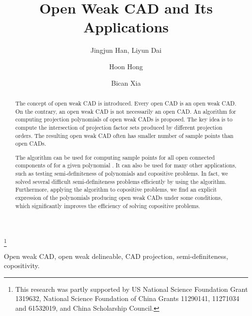 \documentclass[amsthm]{elsart}
\begin{document}
\begin{frontmatter}

\title{\textbf{Open Weak CAD and Its Applications}}

\thanks{This research was partly supported by US National Science Foundation Grant 1319632, National Science Foundation of China Grants 11290141, 11271034 and 61532019, and China Scholarship Council.}

\author{Jingjun Han, Liyun Dai}
\address{LMAM  School of Mathematical Sciences\\  Beijing International Center for Mathematical Research\\Peking University, Beijing 100871, China}

\author{Hoon Hong}
\address{Department of Mathematics, North Carolina State University, Raleigh NC 27695, USA}

\author{Bican Xia}
\address{LMAM  School of Mathematical Sciences, Peking University, Beijing 100871, China}


\begin{abstract}
The concept of open weak CAD is introduced. Every open CAD is an open weak CAD. On the contrary, an open weak CAD is not necessarily an open CAD. An algorithm for computing projection polynomials of open weak CADs is proposed. The key idea is to compute the intersection of projection factor sets produced by different projection orders. The resulting open weak CAD often has smaller number of sample points than open CADs.

The algorithm can be used for computing sample points for all open connected components of  for a given polynomial . It can also be used for many other applications, such as testing semi-definiteness of polynomials and copositive problems. In fact, we solved several difficult semi-definiteness problems   efficiently by using the algorithm. Furthermore, applying the algorithm to copositive problems, we find an explicit expression of the polynomials producing open weak CADs under some conditions, which significantly improves the efficiency of solving copositive problems.




\end{abstract}
\begin{keyword}
Open weak CAD, open weak delineable, CAD projection, semi-definiteness, copositivity.
\end{keyword}

\end{frontmatter}
\end{document}
